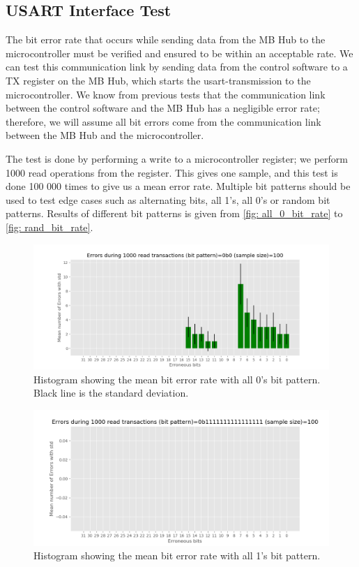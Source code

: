 \documentclass[main.tex]{subfiles}
\begin{document}
\subsection{USART Interface Test}

\label{ssec: bit_error}
The bit error rate that occurs while sending data from the MB Hub to the microcontroller must be verified and ensured to be within an acceptable rate. We can test this communication link by sending data from the control software to a TX register on the MB Hub, which starts the \gls{usart}-transmission to the microcontroller. We know from previous tests that the communication link between the control software and the MB Hub has a negligible error rate; therefore, we will assume all bit errors come from the communication link between the MB Hub and the microcontroller.

The test is done by performing a write to a microcontroller register; we perform 1000 read operations from the register. This gives one sample, and this test is done 100 000 times to give us a mean error rate. Multiple bit patterns should be used to test edge cases such as alternating bits, all 1's, all 0's or random bit patterns. Results of different bit patterns is given from \autoref{fig: all_0_bit_rate} to \ref{fig: rand_bit_rate}.

 


\begin{figure}[!ht]
    \centering
    \includegraphics[width=18cm]{images/error_rate_all_0s.png}
    \caption{Histogram showing the mean bit error rate with all 0's bit pattern. Black line is the standard deviation.}
    \label{fig: all_0_bit_rate}
\end{figure}
\FloatBarrier

\begin{figure}[!ht]
    \centering
    \includegraphics[width=18cm]{images/error_rate_all_1s.png}
    \caption{Histogram showing the mean bit error rate with all 1's bit pattern.}
    \label{fig: all_1_bit_rate}
\end{figure}
\FloatBarrier
\end{document}
